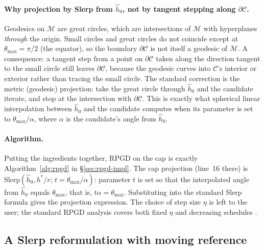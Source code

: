 \documentclass[11pt]{article}
\newcommand{\hh}{\hat h}
\newcommand{\thmax}{\theta_{\max}}
\begin{document}
\paragraph{Why projection by Slerp from $\hh_0$, not by tangent stepping along $\partial\mathcal{C}$.} Geodesics on $\mathcal{M}$ are great circles, which are intersections of $\mathcal{M}$ with hyperplanes \emph{through} the origin. Small circles and great circles do not coincide except at $\thmax = \pi/2$ (the equator), so the boundary $\partial\mathcal{C}$ is not itself a geodesic of $\mathcal{M}$. A consequence: a tangent step from a point on $\partial\mathcal{C}$ taken along the direction tangent to the small circle still leaves $\partial\mathcal{C}$, because the geodesic curves into $\mathcal{C}$'s interior or exterior rather than tracing the small circle. The standard correction is the metric (geodesic) projection: take the great circle through $\hh_0$ and the candidate iterate, and stop at the intersection with $\partial\mathcal{C}$. This is exactly what spherical linear interpolation between $\hh_0$ and the candidate computes when its parameter is set to $\thmax/\alpha$, where $\alpha$ is the candidate's angle from $\hh_0$.

\paragraph{Algorithm.} Putting the ingredients together, RPGD on the cap is exactly Algorithm~\ref{alg:rpgd} in \S\ref{sec:rpgd-impl}. The cap projection (line~16 there) is Slerp$(\hh_0, h^*/r;\, t = \thmax/\alpha)$: parameter $t$ is set so that the interpolated angle from $\hh_0$ equals $\thmax$, that is, $t\alpha = \thmax$. Substituting into the standard Slerp formula gives the projection expression. The choice of step size $\eta$ is left to the user; the standard RPGD analysis covers both fixed $\eta$ and decreasing schedules \citep{bonnabel2013stochastic, tripuraneni2018averaging}.

\subsection*{A Slerp reformulation with moving reference}
\end{document}
